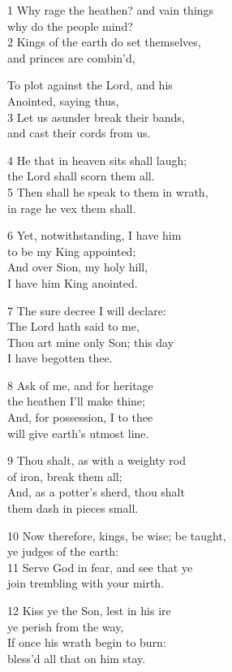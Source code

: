 1 Why rage the heathen? and vain things\\
why do the people mind?\\
2 Kings of the earth do set themselves,\\
and princes are combin’d,

To plot against the Lord, and his\\
Anointed, saying thus,\\
3 Let us asunder break their bands,\\
and cast their cords from us.

4 He that in heaven sits shall laugh;\\
the Lord shall scorn them all.\\
5 Then shall he speak to them in wrath,\\
in rage he vex them shall.

6 Yet, notwithstanding, I have him\\
to be my King appointed;\\
And over Sion, my holy hill,\\
I have him King anointed.

7 The sure decree I will declare:\\
The Lord hath said to me,\\
Thou art mine only Son; this day\\
I have begotten thee.

8 Ask of me, and for heritage\\
the heathen I’ll make thine;\\
And, for possession, I to thee\\
will give earth’s utmost line.

9 Thou shalt, as with a weighty rod\\
of iron, break them all;\\
And, as a potter’s sherd, thou shalt\\
them dash in pieces small.

10 Now therefore, kings, be wise; be taught, \\
ye judges of the earth:\\
11 Serve God in fear, and see that ye\\
join trembling with your mirth.

12 Kiss ye the Son, lest in his ire \\
ye perish from the way, \\
If once his wrath begin to burn: \\
bless’d all that on him stay.

